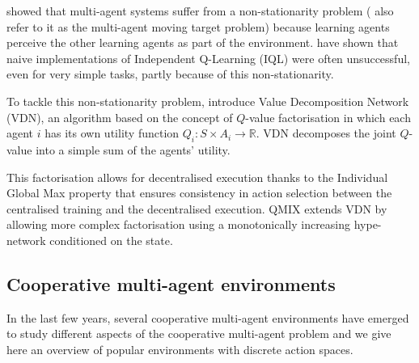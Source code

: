 \citet{laurent_world_2011_non-markovian} showed that multi-agent systems suffer from a non-stationarity problem (\citet{tuyls_multiagent_2012_moving_target} also refer to it as the multi-agent moving target problem) because learning agents perceive the other learning agents as part of the environment. \citet{claus_dynamics_1998} have shown that naive implementations of Independent Q-Learning (IQL) were often unsuccessful, even for very simple tasks, partly because of this non-stationarity.

To tackle this non-stationarity problem, \citet{vdn_sunehag_value-decomposition_2018} introduce Value Decomposition Network (VDN), an algorithm based on the concept of $Q$-value factorisation \citep{oliehoek_exploiting_2008_factorisation} in which each agent $i$ has its own utility function $Q_i: S \times A_i \rightarrow \mathbb{R}$. VDN decomposes the joint $Q$-value into a simple sum of the agents' utility.

This factorisation allows for decentralised execution thanks to the Individual Global Max property \citep[IGM]{son_qtran_2019} that ensures consistency in action selection between the centralised training and the decentralised execution.
QMIX \citep{rashid_qmix_2018} extends VDN by allowing more complex factorisation using a monotonically increasing hype-network conditioned on the state. 





\subsection{Cooperative multi-agent environments}
\label{sec:environemnts}

In the last few years, several cooperative multi-agent environments have emerged to study different aspects of the cooperative multi-agent problem and we give here an overview of popular environments with discrete action spaces.

